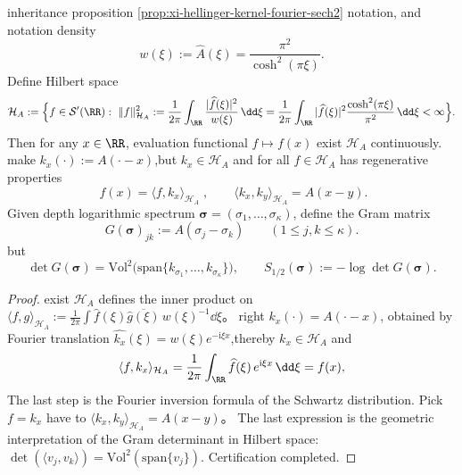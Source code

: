 \begin{proposition}\label{prop:xi-hellinger-kernel-rkhs-volume}
inheritance proposition \ref{prop:xi-hellinger-kernel-fourier-sech2} notation, and notation density
\[
w(\xi):=\widehat A(\xi)=\frac{\pi^2}{\cosh^2(\pi\xi)}.
\]
Define Hilbert space
\[
\mathcal H_{A}
:=\Bigl\{f\in\mathcal S'(\RR):\ \|f\|_{\mathcal H_A}^{2}
:=\frac{1}{2\pi}\int_{\RR}\frac{|\widehat f(\xi)|^{2}}{w(\xi)}\,\dd\xi
=\frac{1}{2\pi}\int_{\RR}|\widehat f(\xi)|^{2}\frac{\cosh^{2}(\pi\xi)}{\pi^{2}}\,\dd\xi<\infty\Bigr\}.
\]
Then for any \(x\in\RR\), evaluation functional \(f\mapsto f(x)\) exist \(\mathcal H_A\) continuously.
make \(k_x(\cdot):=A(\cdot-x)\),but \(k_x\in\mathcal H_A\) and for all \(f\in\mathcal H_A\) has regenerative properties
\[
\boxed{\;f(x)=\langle f,k_x\rangle_{\mathcal H_A}\;},
\qquad
\langle k_x,k_y\rangle_{\mathcal H_A}=A(x-y).
\]
Given depth logarithmic spectrum \(\boldsymbol{\sigma}=(\sigma_1,\dots,\sigma_\kappa)\), define the Gram matrix
\[
G(\boldsymbol{\sigma})_{jk}:=A(\sigma_j-\sigma_k)\qquad(1\le j,k\le\kappa).
\]
but
\[
\boxed{\;
\det G(\boldsymbol{\sigma})
=\mathrm{Vol}^{2}\bigl(\mathrm{span}\{k_{\sigma_1},\dots,k_{\sigma_\kappa}\}\bigr),\qquad
S_{1/2}(\boldsymbol{\sigma}):=-\log\det G(\boldsymbol{\sigma}).\;}
\]
\end{proposition}
\begin{proof}
exist \(\mathcal H_A\) defines the inner product on
\(
\langle f,g\rangle_{\mathcal H_A}:=\frac{1}{2\pi}\int \widehat f(\xi)\overline{\widehat g(\xi)}\,w(\xi)^{-1}\dd\xi
\)。
right \(k_x(\cdot)=A(\cdot-x)\), obtained by Fourier translation \(\widehat{k_x}(\xi)=w(\xi)e^{-\mathrm{i}\xi x}\),thereby \(k_x\in\mathcal H_A\) and
\[
\langle f,k_x\rangle_{\mathcal H_A}
=\frac{1}{2\pi}\int_{\RR}\widehat f(\xi)\,e^{\mathrm{i}\xi x}\,\dd\xi
=f(x),
\]
The last step is the Fourier inversion formula of the Schwartz distribution.
Pick \(f=k_x\) have to \(\langle k_x,k_y\rangle_{\mathcal H_A}=A(x-y)\)。
The last expression is the geometric interpretation of the Gram determinant in Hilbert space:\(\det(\langle v_j,v_k\rangle)=\mathrm{Vol}^{2}(\mathrm{span}\{v_j\})\). Certification completed.
\end{proof}



